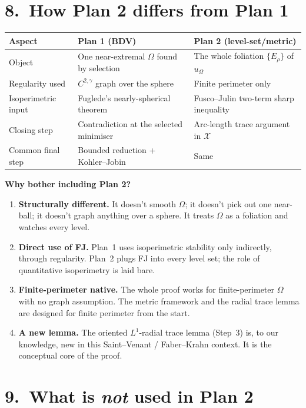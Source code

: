 \documentclass[11pt,a4paper]{article}
\newcommand{\X}{\mathcal{X}}
\newcommand{\Erho}{E_\rho}
\begin{document}
\section*{8.\ How Plan 2 differs from Plan 1}

\begin{center}
\begin{tabularx}{\linewidth}{@{}l X X@{}}
\toprule
\textbf{Aspect} & \textbf{Plan 1 (BDV)} & \textbf{Plan 2 (level-set/metric)}\\
\midrule
Object & One near-extremal $\Omega$ found by selection & The whole foliation $\{\Erho\}$ of $u_\Omega$\\
Regularity used & $C^{2,\gamma}$ graph over the sphere & Finite perimeter only\\
Isoperimetric input & Fuglede's nearly-spherical theorem & Fusco--Julin two-term sharp inequality\\
Closing step & Contradiction at the selected minimiser & Arc-length trace argument in $\X$\\
Common final step & Bounded reduction + Kohler--Jobin & Same\\
\bottomrule
\end{tabularx}
\end{center}

\textbf{Why bother including Plan 2?}
\begin{enumerate}[leftmargin=*,itemsep=2pt]
\item \textbf{Structurally different.} It doesn't smooth $\Omega$; it doesn't pick out one near-ball; it doesn't graph anything over a sphere. It treats $\Omega$ as a foliation and watches every level.
\item \textbf{Direct use of FJ.} Plan~1 uses isoperimetric stability only indirectly, through regularity. Plan~2 plugs FJ into every level set; the role of quantitative isoperimetry is laid bare.
\item \textbf{Finite-perimeter native.} The whole proof works for finite-perimeter $\Omega$ with no graph assumption. The metric framework and the radial trace lemma are designed for finite perimeter from the start.
\item \textbf{A new lemma.} The oriented $L^1$-radial trace lemma (Step~3) is, to our knowledge, new in this Saint--Venant / Faber--Krahn context. It is the conceptual core of the proof.
\end{enumerate}

\section*{9.\ What is \emph{not} used in Plan 2}
\end{document}
